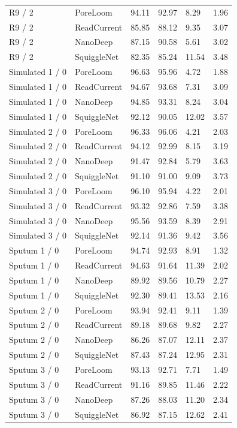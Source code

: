 \begin{longtable}{llllll}
R9 / 2 & PoreLoom & 94.11 & 92.97 & 8.29 & 1.96\\
R9 / 2 & ReadCurrent & 85.85 & 88.12 & 9.35 & 3.07\\
R9 / 2 & NanoDeep & 87.15 & 90.58 & 5.61 & 3.02\\
R9 / 2 & SquiggleNet & 82.35 & 85.24 & 11.54 & 3.48\\
Simulated 1 / 0 & PoreLoom & 96.63 & 95.96 & 4.72 & 1.88\\
Simulated 1 / 0 & ReadCurrent & 94.67 & 93.68 & 7.31 & 3.09\\
Simulated 1 / 0 & NanoDeep & 94.85 & 93.31 & 8.24 & 3.04\\
Simulated 1 / 0 & SquiggleNet & 92.12 & 90.05 & 12.02 & 3.57\\
Simulated 2 / 0 & PoreLoom & 96.33 & 96.06 & 4.21 & 2.03\\
Simulated 2 / 0 & ReadCurrent & 94.12 & 92.99 & 8.15 & 3.19\\
Simulated 2 / 0 & NanoDeep & 91.47 & 92.84 & 5.79 & 3.63\\
Simulated 2 / 0 & SquiggleNet & 91.10 & 91.00 & 9.09 & 3.73\\
Simulated 3 / 0 & PoreLoom & 96.10 & 95.94 & 4.22 & 2.01\\
Simulated 3 / 0 & ReadCurrent & 93.32 & 92.86 & 7.59 & 3.38\\
Simulated 3 / 0 & NanoDeep & 95.56 & 93.59 & 8.39 & 2.91\\
Simulated 3 / 0 & SquiggleNet & 92.14 & 91.36 & 9.42 & 3.56\\
Sputum 1 / 0 & PoreLoom & 94.74 & 92.93 & 8.91 & 1.32\\
Sputum 1 / 0 & ReadCurrent & 94.63 & 91.64 & 11.39 & 2.02\\
Sputum 1 / 0 & NanoDeep & 89.92 & 89.56 & 10.79 & 2.27\\
Sputum 1 / 0 & SquiggleNet & 92.30 & 89.41 & 13.53 & 2.16\\
Sputum 2 / 0 & PoreLoom & 93.94 & 92.41 & 9.11 & 1.39\\
Sputum 2 / 0 & ReadCurrent & 89.18 & 89.68 & 9.82 & 2.27\\
Sputum 2 / 0 & NanoDeep & 86.26 & 87.07 & 12.11 & 2.37\\
Sputum 2 / 0 & SquiggleNet & 87.43 & 87.24 & 12.95 & 2.31\\
Sputum 3 / 0 & PoreLoom & 93.13 & 92.71 & 7.71 & 1.49\\
Sputum 3 / 0 & ReadCurrent & 91.16 & 89.85 & 11.46 & 2.22\\
Sputum 3 / 0 & NanoDeep & 87.26 & 88.03 & 11.20 & 2.34\\
Sputum 3 / 0 & SquiggleNet & 86.92 & 87.15 & 12.62 & 2.41\\
\end{longtable}
